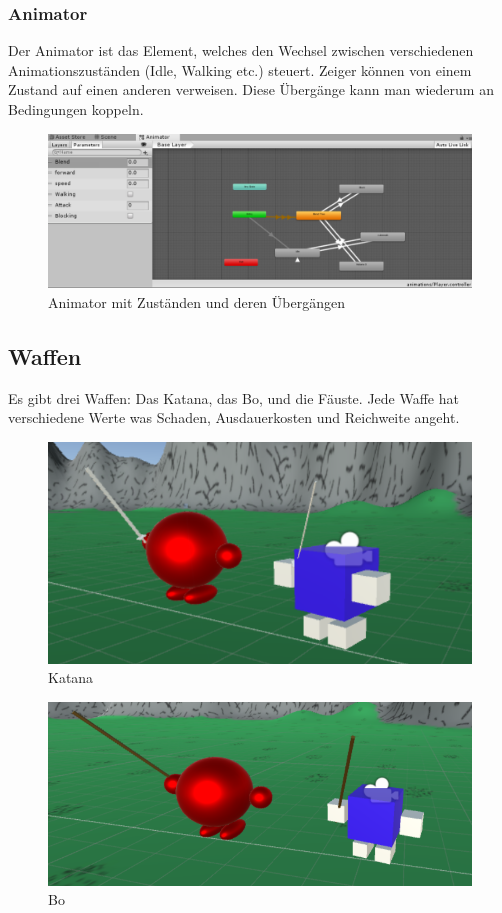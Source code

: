 \subsubsection{Animator}
Der Animator ist das Element, welches den Wechsel zwischen verschiedenen Animationszuständen (Idle, Walking etc.) steuert. Zeiger können von einem Zustand auf einen anderen verweisen. Diese Übergänge kann man wiederum an Bedingungen koppeln.
\begin{figure}[H]
\includegraphics[scale=0.67]{screenshots/animator.png}
\caption{Animator mit Zuständen und deren Übergängen}
\end{figure}

\subsection{Waffen}
\label{subsec:weapons}
Es gibt drei  Waffen: Das Katana, das Bo, und die Fäuste.
Jede Waffe hat verschiedene Werte was Schaden, Ausdauerkosten und Reichweite angeht.
\begin{figure}[H]
\includegraphics[scale=1]{screenshots/katana.png}
\caption{Katana}
\end{figure}

\begin{figure}[H]
\includegraphics[scale=1]{screenshots/bo.png}
\caption{Bo}
\end{figure}



